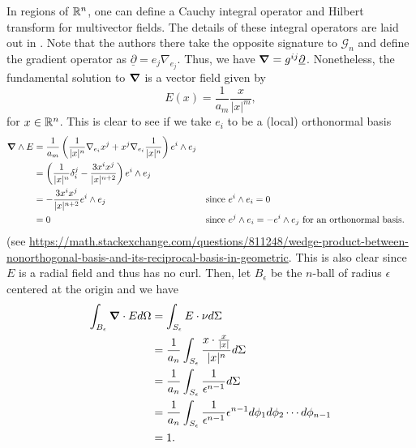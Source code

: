 \documentclass[12pt]{article}
\begin{document}
In regions of $\mathbb{R}^n$, one can define a Cauchy integral operator and Hilbert transform for multivector fields.  The details of these integral operators are laid out in \cite{brackx_hilbert_2008}. Note that the authors there take the opposite signature to $\mathcal{G}_n$ and define the gradient operator as $\underline{\partial} = e_j \nabla_{e_j}$.  Thus, we have $\boldsymbol{\nabla} = g^{ij} \underline{\partial}$.  Nonetheless, the fundamental solution to $\boldsymbol{\nabla}$ is a vector field given by
\[
E(x) = \frac{1}{a_m} \frac{x}{|x|^m},
\]
for $x\in \mathbb{R}^n$.  This is clear to see if we take $e_i$ to be a (local) orthonormal basis
\begin{align*}
\boldsymbol{\nabla} \wedge E &= \frac{1}{a_m}  \left( \frac{1}{|x|^n} \nabla_{e_i} x^j + x^j \nabla_{e_i} \frac{1}{|x|^n} \right) e^i \wedge e_j\\
&= \left( \frac{1}{|x|^n} \delta_i^j -\frac{3x^ix^j}{|x|^{n+2}} \right) e^i \wedge e_j\\
&= -\frac{3x^i x^j}{|x|^{n+2}} e^i \wedge e_j &&\textrm{since $e^i \wedge e_i=0$}\\
&= 0 &&\textrm{since $e^j\wedge e_i = -e^i \wedge e_j$ for an orthonormal basis.}
\end{align*}
(see \url{https://math.stackexchange.com/questions/811248/wedge-product-between-nonorthogonal-basis-and-its-reciprocal-basis-in-geometric}. This is also clear since $E$ is a radial field and thus has no curl. Then, let $B_{\epsilon}$ be the $n$-ball of radius $\epsilon$ centered at the origin and we have
\begin{align*}
\int_{B_\epsilon} \boldsymbol{\nabla} \cdot Ed \Omega &= \int_{S_\epsilon} E \cdot \nu d\Sigma\\
&=\frac{1}{a_n} \int_{S_\epsilon} \frac{x\cdot \frac{x}{|x|}}{|x|^n} d\Sigma\\
&= \frac{1}{a_n} \int_{S_\epsilon} \frac{1}{\epsilon^{n-1}} d\Sigma\\
&= \frac{1}{a_n} \int_{S_\epsilon} \frac{1}{\epsilon^{n-1}} \epsilon^{n-1} d\phi_1 d\phi_2 \cdots d\phi_{n-1}\\
&= 1.
\end{align*}
\end{document}
